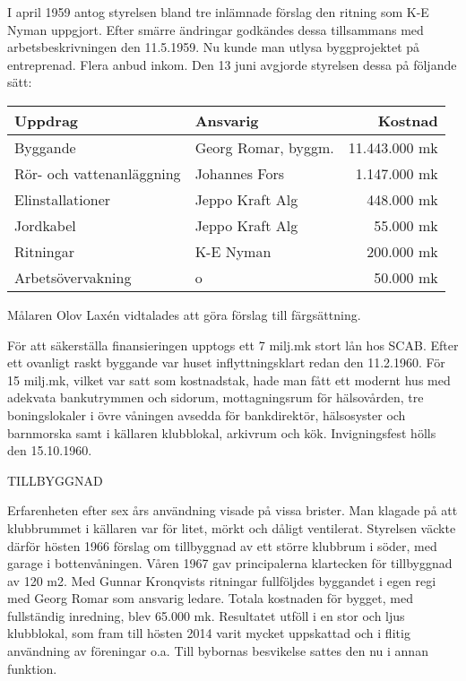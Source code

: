 I april 1959 antog styrelsen bland tre inlämnade förslag den ritning som K-E Nyman uppgjort. Efter smärre ändringar godkändes dessa tillsammans med arbetsbeskrivningen den 11.5.1959. Nu kunde man utlysa byggprojektet på entreprenad. Flera anbud inkom. Den 13 juni avgjorde styrelsen dessa på följande sätt:

\begin{center}
  \begin{tabular}{l l r}
    \hline
    Uppdrag & Ansvarig & Kostnad \\ \hline
    Byggande & Georg Romar, byggm. & 11.443.000 mk \\
    Rör- och vattenanläggning & Johannes Fors & 1.147.000 mk \\
    Elinstallationer & Jeppo Kraft Alg & 448.000 mk \\
    Jordkabel & Jeppo Kraft Alg & 55.000 mk \\
    Ritningar & K-E Nyman & 200.000 mk \\
    Arbetsövervakning & o & 50.000 mk \\
    \hline
  \end{tabular}
\end{center}
Målaren Olov Laxén vidtalades att göra förslag till färgsättning.

För att säkerställa finansieringen upptogs ett 7 milj.mk stort lån hos SCAB. Efter ett ovanligt raskt byggande var huset inflyttningsklart redan den 11.2.1960. För 15 milj.mk, vilket var satt som kostnadstak, hade man fått ett modernt hus med adekvata bankutrymmen och sidorum, mottagningsrum för hälsovården, tre boningslokaler i övre våningen avsedda för bankdirektör, hälsosyster och barnmorska samt i källaren klubblokal, arkivrum och kök. Invigningsfest hölls den 15.10.1960.



TILLBYGGNAD

Erfarenheten efter sex års användning visade på vissa brister. Man klagade på att klubbrummet i källaren var för litet, mörkt och dåligt ventilerat. Styrelsen väckte därför hösten 1966 förslag om tillbyggnad av ett större klubbrum i söder, med garage i bottenvåningen. Våren 1967 gav principalerna klartecken för tillbyggnad av 120 m2. Med Gunnar Kronqvists ritningar fullföljdes byggandet i egen regi med Georg Romar som ansvarig ledare. Totala kostnaden för bygget, med fullständig inredning, blev 65.000 mk. Resultatet utföll i en stor och ljus klubblokal, som fram till hösten 2014 varit mycket uppskattad och i flitig användning av föreningar o.a. Till bybornas besvikelse sattes den nu i annan funktion.



